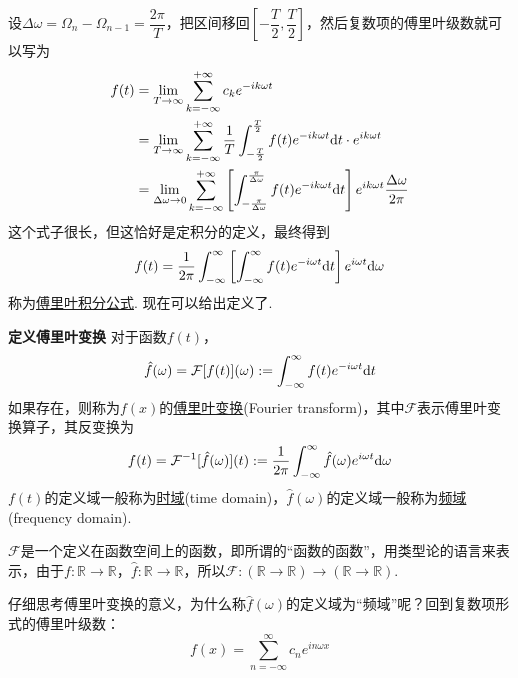\documentclass[UTF8]{ctexart}
\newcommand{\trm}[1]{{\rm #1}}
\newenvironment{definition}[1]
    {\begin{tcolorbox}[enhanced, colback=LightYellow, breakable=false, frame hidden, borderline west={1.5mm}{-2mm}{DarkGreen}]
    {\bfseries {\color{DarkGreen} 定义}\quad #1} \newline}
    {\end{tcolorbox}}
\begin{document}
设\(\Delta\omega=\Omega_n-\Omega_{n-1}=\dfrac{2\pi}{T}\)，把区间移回\([-\dfrac{T}{2},\dfrac{T}{2}]\)，然后复数项的傅里叶级数就可以写为
\begin{align*}
    f(t) &= \lim_{T \to \infty}\sum_{k=-\infty}^{+\infty}c_ke^{-ik\omega t} \\
    &= \lim_{T \to \infty}\sum_{k=-\infty}^{+\infty}\frac{1}{T} \int_{-\frac{T}{2}}^{\frac{T}{2}}f(t)e^{-ik\omega t}\trm{d}t\cdot e^{ik\omega t} \\
    &= \lim_{\Delta\omega \to 0}\sum_{k=-\infty}^{+\infty} \left[\int_{-\frac{\pi}{\Delta\omega}}^{\frac{\pi}{\Delta\omega}}f(t)e^{-ik\omega t}\trm{d}t \right]e^{ik\omega t}\frac{\Delta\omega}{2\pi}
\end{align*}
这个式子很长，但这恰好是定积分的定义，最终得到
\[ f(t) = \frac{1}{2\pi}\int_{-\infty}^{\infty} \left[\int_{-\infty}^{\infty}f(t)e^{-i\omega t}\trm{d}t \right]e^{i\omega t}\trm{d}\omega \]
称为\uline{傅里叶积分公式}. 现在可以给出定义了.

\begin{definition}{傅里叶变换}
    对于函数\(f(t)\)，
    \[\hat{f}(\omega) = \mathcal{F}[f(t)](\omega) := \int_{-\infty}^{\infty}f(t)e^{-i\omega t}\trm{d}t\]
    如果存在，则称为\(f(x)\)的\uline{傅里叶变换}(Fourier transform)，其中\(\mathcal{F}\)表示傅里叶变换算子，其反变换为
    \[f(t) = \mathcal{F}^{-1}[\hat{f}(\omega)](t) := \frac{1}{2\pi}\int_{-\infty}^{\infty}\hat{f}(\omega)e^{i\omega t}\trm{d}\omega\]
    \(f(t)\)的定义域一般称为\uline{时域}(time domain)，\(\hat{f}(\omega)\)的定义域一般称为\uline{频域}(frequency domain).
\end{definition}
\(\mathcal{F}\)是一个定义在函数空间上的函数，即所谓的“函数的函数”，用类型论的语言来表示，由于\(f:\mathbb{R}\to\mathbb{R}\)，\(\hat{f}:\mathbb{R}\to\mathbb{R}\)，所以\(\mathcal{F}:(\mathbb{R}\to\mathbb{R})\to(\mathbb{R}\to\mathbb{R})\). 

\vspace{1cm}

仔细思考傅里叶变换的意义，为什么称\(\hat{f}(\omega)\)的定义域为“频域”呢？回到复数项形式的傅里叶级数：
\[f(x) = \sum_{n=-\infty}^{\infty}c_ne^{in\omega x}\]
\end{document}
